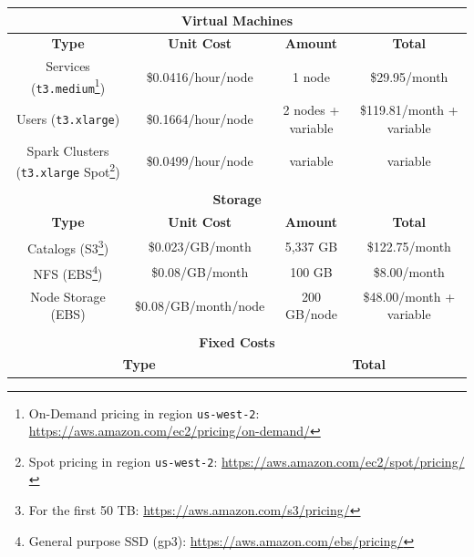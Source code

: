 \documentclass[twocolumn, linenumbers]{aastex631}
\begin{document}
\begin{table}
    \centering
    \begin{tabular}{cccc}
        \multicolumn{4}{c}{\textbf{Virtual Machines}} \\ \hline\hline
        \textbf{Type} & \textbf{Unit Cost} & \textbf{Amount} & \textbf{Total} 
        \\ \hline
        
        Services (\texttt{t3.medium}\footnote{On-Demand pricing in region \texttt{us-west-2}: \url{https://aws.amazon.com/ec2/pricing/on-demand/}}) & \$0.0416/hour/node & 1 node & \$29.95/month
        \\ \hline
        Users (\texttt{t3.xlarge}) & \$0.1664/hour/node & 2 nodes + variable & \$119.81/month + variable
        \\ \hline
        Spark Clusters (\texttt{t3.xlarge} Spot\footnote{Spot pricing in region \texttt{us-west-2}: \url{https://aws.amazon.com/ec2/spot/pricing/}}) & \$0.0499/hour/node & variable & variable
        \\ \hline\hline \\
        
        \multicolumn{4}{c}{\textbf{Storage}} \\ \hline\hline 
        
        \textbf{Type} & \textbf{Unit Cost} & \textbf{Amount} & \textbf{Total} 
        \\ \hline
        
        Catalogs (S3\footnote{For the first 50 TB: \url{https://aws.amazon.com/s3/pricing/}}) & \$0.023/GB/month & 5,337 GB & \$122.75/month 
        \\ \hline
        
        NFS (EBS\footnote{\label{fn:ebs}General purpose SSD (gp3): \url{https://aws.amazon.com/ebs/pricing/}}) & \$0.08/GB/month & 100 GB & \$8.00/month 
        \\ \hline
        
        Node Storage (EBS) & \$0.08/GB/month/node & 200 GB/node & \$48.00/month + variable
        \\ \hline\hline \\
        
        \multicolumn{4}{c}{\textbf{Fixed Costs}}
        \\ \hline\hline
        
        \multicolumn{2}{c}{\textbf{Type}} & \multicolumn{2}{c}{\textbf{Total}}
        \\ \hline
        

\end{tabular}
\end{table}
\end{document}
